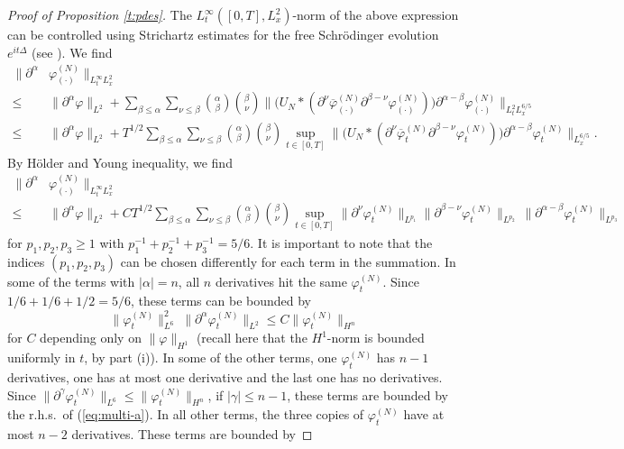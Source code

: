 \documentclass[11pt,a4paper]{article}
\begin{document}
\begin{proof}[Proof of Proposition \ref{t:pdes}]
The $L_t^\infty ([0,T] , L_x^2)$-norm of the above expression can be controlled using
Strichartz estimates for the free Schr\"odinger evolution $e^{it\Delta}$
(see \cite[Theorem 1.2]{KT}). We find
\[\begin{split}
\| \partial^\alpha & \varphi^{(N)}_{(\cdot)} \|_{L_t^\infty L_x^2}  \\ \leq \; & \|
    \partial^\alpha \varphi \|_{L^2} +  \sum_{\beta \le \alpha} \sum_{\nu \le \beta} \binom{\alpha}{\beta}
    \binom{\beta}{\nu} \| \big( U_N * (\partial^\nu
    \overline{\varphi}^{(N)}_{(\cdot)} \partial^{\beta - \nu} \varphi^{(N)}_{(\cdot)})
    \big) \partial^{\alpha - \beta} \varphi^{(N)}_{(\cdot)} \|_{L_t^2 L_x^{6/5}} \\
     \leq \; & \|
    \partial^\alpha \varphi \|_{L^2} +  T^{1/2} \sum_{\beta \le \alpha} \sum_{\nu \le \beta} \binom{\alpha}{\beta}
    \binom{\beta}{\nu}  \sup_{t \in [0,T]} \| \big( U_N * (\partial^\nu
    \overline{\varphi}^{(N)}_{t} \partial^{\beta - \nu} \varphi^{(N)}_{t})
    \big) \partial^{\alpha - \beta} \varphi^{(N)}_{t} \|_{L_x^{6/5}}.
\end{split} \]    
By H\"older and Young inequality, we find 
\[ \begin{split}
\| \partial^\alpha & \varphi^{(N)}_{(\cdot)} \|_{L_t^\infty L_x^2} \\ \leq \; & \|
    \partial^\alpha \varphi \|_{L^2} + C T^{1/2}  \sum_{\beta \le \alpha} \sum_{\nu \le \beta}
    \binom{\alpha}{\beta} \binom{\beta}{\nu} \sup_{t \in [0,T]} \|
    \partial^\nu \varphi_t^{(N)} \|_{L^{p_1}} \| \partial^{\beta - \nu} \varphi_t^{(N)}
    \|_{L^{p_2}} \, \| \partial^{\alpha - \beta} \varphi_t^{(N)}
    \|_{L^{p_3}} 
  \end{split}\]
for $p_1, p_2, p_3 \geq 1$ with $p_1^{-1} + p_2^{-1} + p_3^{-1} = 5/6$. It is important to note that the indices $(p_1, p_2, p_3)$ can be chosen differently for each term in the summation. In some of the terms with $\lvert \alpha\rvert = n$, all $n$ derivatives hit the same $\varphi_t^{(N)}$. Since $1/6 + 1/6 + 1/2 = 5/6$, these terms can be bounded by
\begin{equation}\label{eq:multi-a}  \| \varphi_t^{(N)} \|^2_{L^6} \; \| \partial^\alpha \varphi_t^{(N)} \|_{L^2} \leq C \| \varphi_t^{(N)} \|_{H^n} \end{equation} for $C$ depending only on $\| \varphi \|_{H^1}$ (recall here that the $H^1$-norm is bounded uniformly in $t$, by part (i)). In some of the other terms, one $\varphi_t^{(N)}$ has $n - 1$ derivatives, one has at most one derivative and the last one has no derivatives. Since $\| \partial^{\gamma} \varphi_t^{(N)} \|_{L^6} \leq \| \varphi_t^{(N)} \|_{H^n}$, if $|\gamma| \leq n-1$, these terms are bounded by the r.h.s.\ of (\ref{eq:multi-a}). In all other terms, the three copies of $\varphi_t^{(N)}$ have at most $n-2$ derivatives. These terms are bounded by 

\end{proof}
\end{document}
